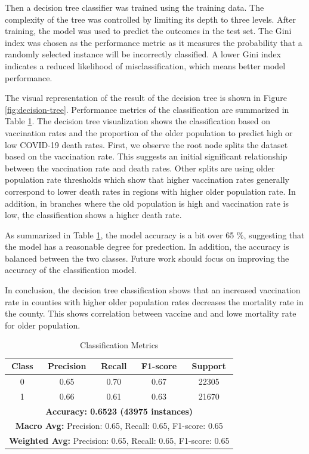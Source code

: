 \documentclass[sigconf,screen,nonacm]{acmart}
\begin{document}
Then a decision tree classifier was trained using the training data. The complexity of the tree was controlled by limiting its depth to three levels. After training, the model was used to predict the outcomes in the test set. The Gini index was chosen as the performance metric as it measures the probability that a randomly selected instance will be incorrectly classified. A lower Gini index indicates a reduced likelihood of misclassification, which means better model performance.

The visual representation of the result of the decision tree is shown in Figure \ref{fig:decision-tree}. Performance metrics of the classification are summarized in Table \ref{Table:Corr-results}. The decision tree visualization shows the classification based on vaccination rates and the proportion of the older population to predict high or low COVID-19 death rates. First, we observe the root node splits the dataset based on the vaccination rate. This suggests an initial significant relationship between the vaccination rate and death rates. Other splits are using older population rate thresholds which show that higher vaccination rates generally correspond to lower death rates in regions with higher older population rate. In addition, in branches where the old population is high and vaccination rate is low, the classification shows a higher death rate.

As summarized in Table \ref{Table:Corr-results}, the model accuracy is a bit over 65 \%, suggesting that the model has a reasonable degree for predection. In addition, the accuracy is balanced between the two classes. Future work should focus on improving the accuracy of the classification model.

In conclusion, the decision tree classification shows that an increased vaccination rate in counties with higher older population rates decreases the mortality rate in the county. This shows correlation between vaccine and and lowe mortality rate for older population. 

\begin{table}[h]
\centering
\caption{Classification Metrics}
\begin{tabular}{|c|c|c|c|c|}
\hline
\textbf{Class} & \textbf{Precision} & \textbf{Recall} & \textbf{F1-score} & \textbf{Support} \\ \hline
0              & 0.65               & 0.70            & 0.67              & 22305            \\ \hline
1              & 0.66               & 0.61            & 0.63              & 21670            \\ \hline
\multicolumn{5}{|c|}{\textbf{Accuracy: 0.6523 (43975 instances)}}                         \\ \hline
\multicolumn{5}{|c|}{\textbf{Macro Avg:} Precision: 0.65, Recall: 0.65, F1-score: 0.65}  \\ \hline
\multicolumn{5}{|c|}{\textbf{Weighted Avg:} Precision: 0.65, Recall: 0.65, F1-score: 0.65} \\ \hline
\end{tabular}
\label{Table:Corr-results}
\end{table}
\end{document}
